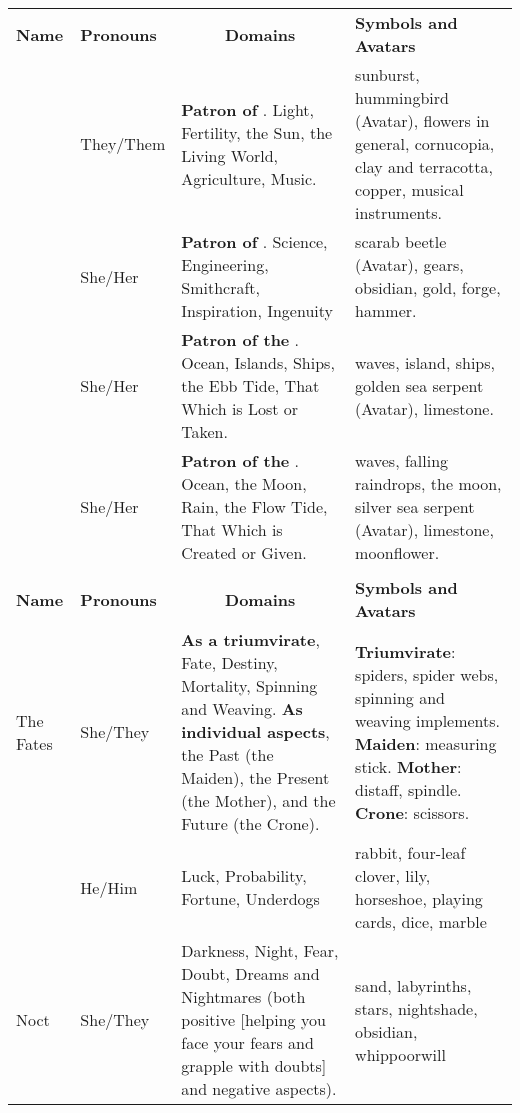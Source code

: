 \documentclass[blue]{GL2020}
\begin{document}
\begin{tabularx}{\textwidth}{|>{\centering\arraybackslash} m{1.8cm} |>{\centering\arraybackslash} m{1.5cm} | X |X |}
\hline
\multicolumn{4}{|c|}{\textbf{{\large The Patron Deities}}} \\
\hline
	\textbf{Name} & \textbf{Pronouns} & \multicolumn{1}{c|}{\textbf{Domains}} & \textbf{Symbols and Avatars} \\
\hline
	\cFarmGod{} & They/Them & \textbf{Patron of \pFarm{}}. Light, Fertility, the Sun, the Living World, Agriculture, Music.  & sunburst, hummingbird (Avatar), flowers in general, cornucopia, clay and terracotta, copper, musical instruments. \\
\hline	
	\cTechGod{} & She/Her & \textbf{Patron of \pTech{}}. Science, Engineering, Smithcraft, Inspiration, Ingenuity  & scarab beetle (Avatar), gears, obsidian, gold, forge, hammer. \\
\hline	
	\cEbbFull{\full} & She/Her & \textbf{Patron of the \pShip{}}. Ocean, Islands, Ships, the Ebb Tide, That Which is Lost or Taken. & waves, island, ships, golden sea serpent (Avatar), limestone. \\
\hline	
	\cFlowFull{\full} & She/Her & \textbf{Patron of the \pShip{}}.  Ocean, the Moon, Rain, the Flow Tide, That Which is Created or Given. & waves, falling raindrops, the moon, silver sea serpent (Avatar), limestone, moonflower. \\
\hline	
\hline	
\multicolumn{4}{|c|}{\textbf{{\large The Minor Deities}}} \\
\hline	
	\textbf{Name} & \textbf{Pronouns} & \multicolumn{1}{c|}{\textbf{Domains}} & \textbf{Symbols and Avatars} \\
\hline	
	The Fates & She/They & \textbf{As a triumvirate}, Fate, Destiny, Mortality, Spinning and Weaving. \textbf{As individual aspects}, the Past (the Maiden), the Present (the Mother), and the Future (the Crone). & \textbf{Triumvirate}: spiders, spider webs, spinning and weaving implements. \textbf{Maiden}: measuring stick. \textbf{Mother}: distaff, spindle. \textbf{Crone}: scissors. \\
\hline	
	\cGenesis{} & He/Him & Luck, Probability, Fortune, Underdogs & rabbit, four-leaf clover, lily, horseshoe, playing cards, dice, marble \\
\hline	
	Noct & She/They & Darkness, Night, Fear, Doubt, Dreams and Nightmares (both positive [helping you face your fears and grapple with doubts] and negative aspects). & sand, labyrinths, stars, nightshade, obsidian, whippoorwill \\

\end{tabularx}
\end{document}
